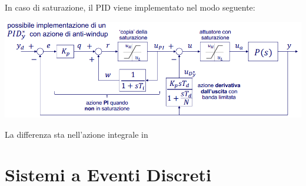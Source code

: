 \documentclass[10pt, letterpaper]{report}
\begin{document}
In caso di saturazione, il PID viene implementato nel modo seguente:
\begin{center}
    \includegraphics[width=\textwidth]{images/antiWindUp1.png}
\end{center}
La differenza sta nell'azione integrale in

\chapter{Sistemi a Eventi Discreti}
\end{document}
